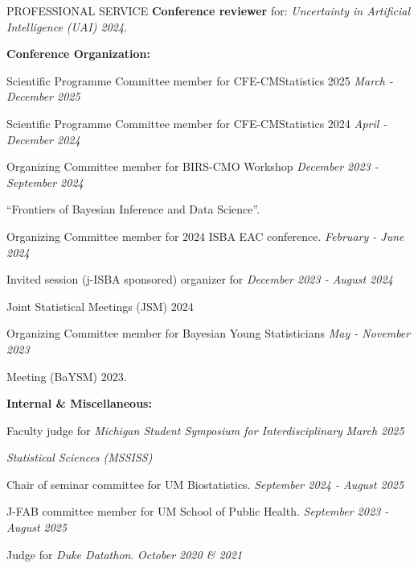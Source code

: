 \documentclass{resume} %
\newcommand{\thisYear}[1]{
	#1
}
\begin{document}
\begin{rSection}{PROFESSIONAL SERVICE}
 \smallskip 
%    
    \textbf{Conference reviewer} for: \emph{Uncertainty in Artificial Intelligence (UAI) 2024}. 
    
    \medskip 

 \hspace*{-0.2in}\textbf{Conference Organization:}
 
 \thisYear{
 	Scientific Programme Committee member for CFE-CMStatistics 2025 \hfill {\em March - December 2025}
 }
 
 	\thisYear{
 Scientific Programme Committee member for CFE-CMStatistics 2024 \hfill {\em April - December 2024}
}
 
 	\thisYear{
 Organizing Committee member for BIRS-CMO Workshop	\hfill {\em December 2023 - September 2024}
 }
\vspace{-0.1in}
	\thisYear{
``Frontiers of Bayesian Inference and Data Science''. 
}

 
\smallskip 
 
	\thisYear{
Organizing Committee member for 2024 ISBA EAC conference. 	\hfill {\em February - June 2024}
}
	
\smallskip

	\thisYear{
Invited session (j-ISBA sponsored) organizer for  \hfill  {\em December 2023 - August 2024}
}

\vspace{-0.1in}
Joint Statistical Meetings (JSM) 2024


\smallskip
	
Organizing Committee member for Bayesian Young Statisticians  \hfill {\em May - November 2023}

\vspace{-0.1in}
Meeting (BaYSM) 2023.


 \hspace*{-0.2in}\textbf{Internal \& Miscellaneous: }
 
 Faculty judge for \emph{Michigan Student Symposium for Interdisciplinary}  \hfill {\em March 2025}


 \vspace*{-0.1in}
 \emph{Statistical Sciences (MSSISS)}

 
 Chair of seminar committee for UM Biostatistics. \hfill {\em September 2024 - August 2025}

 
 J-FAB committee member for UM School of Public Health.  \hfill {\em September 2023 - August 2025}

Judge for \emph{Duke Datathon}.  \hfill {\em October 2020 \& 2021}



\end{rSection}
\end{document}
